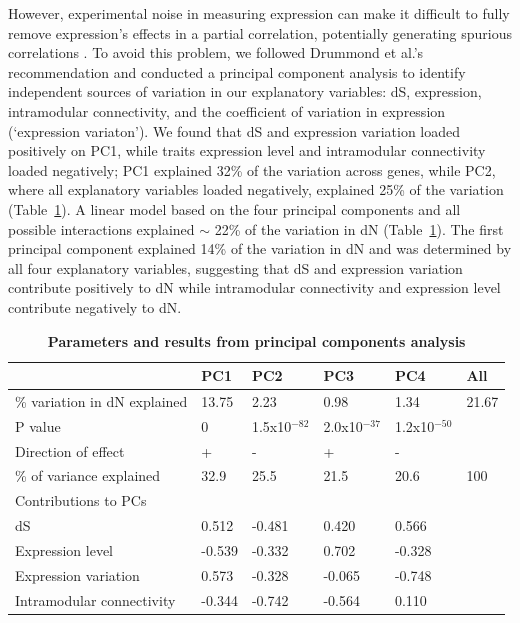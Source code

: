 However, experimental noise in measuring expression can make it difficult to fully remove expression’s effects in a partial correlation, potentially generating spurious correlations \citep{Drummond2006-pa}. To avoid this problem, we followed Drummond et al.’s recommendation and conducted a principal component analysis to identify independent sources of variation in our explanatory variables: dS, expression, intramodular connectivity, and the coefficient of variation in expression (‘expression variaton’). We found that dS and expression variation loaded positively  on PC1, while traits expression level and intramodular connectivity loaded negatively; PC1 explained 32\% of the variation across genes, while PC2, where all explanatory variables loaded negatively, explained 25\% of the variation (Table~\ref{table:t2}). A linear model based on the four principal components and all possible interactions explained $\sim$ 22\% of the variation in dN (Table~\ref{table:t2}). The first principal component explained 14\% of the variation in dN and was determined by all four explanatory variables, suggesting that dS and expression variation contribute positively to dN while intramodular connectivity and expression level contribute negatively to dN. 

\begin{table}[ht!]
\centering
\begin{tabular} {|l|l l l l l|}
\hline
 &PC1 &PC2 &PC3 &PC4 &All \\ [0.5ex]
\hline
\% variation in dN explained & 13.75 &2.23 &0.98& 1.34 & 21.67\\
P value & 0 & 1.5x10$^{-82}$ & 2.0x10$^{-37}$ & 1.2x10$^{-50}$ &  \\
Direction of effect & + & - & + & - & \\
\% of variance explained & 32.9 &25.5 &21.5 &20.6 &100\\
\hline
Contributions to PCs & & & & & \\ [0.5ex]
dS & 0.512 & -0.481 & 0.420 & 0.566 & \\
Expression level & -0.539 &-0.332 &0.702 & -0.328 & \\
Expression variation &0.573 &-0.328 &-0.065 &-0.748 & \\
Intramodular connectivity &-0.344 &-0.742 &-0.564 &0.110 & \\
\hline
\end{tabular}
\caption{\textbf{Parameters and results from principal components analysis}}
\label{table:t2}
\end{table}

